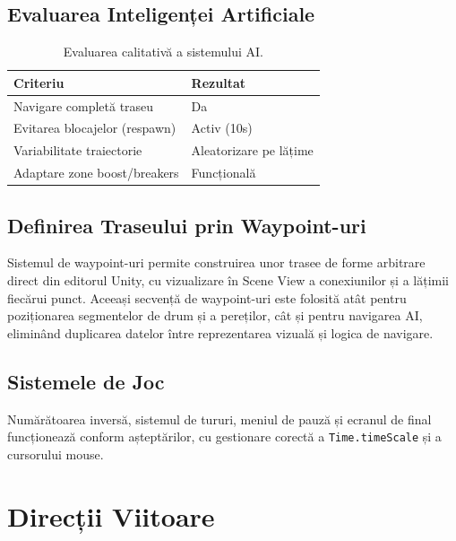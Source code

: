 \documentclass[11pt,twocolumn]{article}
\begin{document}
\subsection{Evaluarea Inteligenței Artificiale}

\begin{table}[h]
\centering
\small
\begin{tabular}{ll}
\toprule
\textbf{Criteriu} & \textbf{Rezultat} \\
\midrule
Navigare completă traseu & Da \\
Evitarea blocajelor (respawn) & Activ (10s) \\
Variabilitate traiectorie & Aleatorizare pe lățime \\
Adaptare zone boost/breakers & Funcțională \\
\bottomrule
\end{tabular}
\caption{Evaluarea calitativă a sistemului AI.}
\label{tab:ai_eval}
\end{table}

\subsection{Definirea Traseului prin Waypoint-uri}

Sistemul de waypoint-uri permite construirea unor trasee de forme arbitrare direct din editorul Unity, cu vizualizare în Scene View a conexiunilor și a lățimii fiecărui punct. Aceeași secvență de waypoint-uri este folosită atât pentru poziționarea segmentelor de drum și a pereților, cât și pentru navigarea AI, eliminând duplicarea datelor între reprezentarea vizuală și logica de navigare.

\subsection{Sistemele de Joc}

Numărătoarea inversă, sistemul de tururi, meniul de pauză și ecranul de final funcționează conform așteptărilor, cu gestionare corectă a \texttt{Time.timeScale} și a cursorului mouse.

\section{Direcții Viitoare}
\label{sec:future_work}
\end{document}
